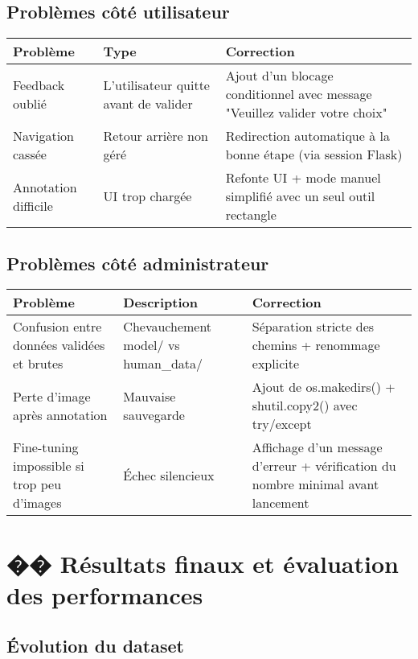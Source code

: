 \documentclass[12pt,a4paper]{report}
\begin{document}
\section{Problèmes côté utilisateur}

\begin{longtable}{|p{3cm}|p{5cm}|p{6cm}|}
\hline
\textbf{Problème} & \textbf{Type} & \textbf{Correction} \\
\hline
Feedback oublié & L'utilisateur quitte avant de valider & Ajout d'un blocage conditionnel avec message "Veuillez valider votre choix" \\
\hline
Navigation cassée & Retour arrière non géré & Redirection automatique à la bonne étape (via session Flask) \\
\hline
Annotation difficile & UI trop chargée & Refonte UI + mode manuel simplifié avec un seul outil rectangle \\
\hline
\end{longtable}

\section{Problèmes côté administrateur}

\begin{longtable}{|p{3cm}|p{5cm}|p{6cm}|}
\hline
\textbf{Problème} & \textbf{Description} & \textbf{Correction} \\
\hline
Confusion entre données validées et brutes & Chevauchement model/ vs human\_data/ & Séparation stricte des chemins + renommage explicite \\
\hline
Perte d'image après annotation & Mauvaise sauvegarde & Ajout de os.makedirs() + shutil.copy2() avec try/except \\
\hline
Fine-tuning impossible si trop peu d'images & Échec silencieux & Affichage d'un message d'erreur + vérification du nombre minimal avant lancement \\
\hline
\end{longtable}

\chapter{�� Résultats finaux et évaluation des performances}

\section{Évolution du dataset}
\end{document}

